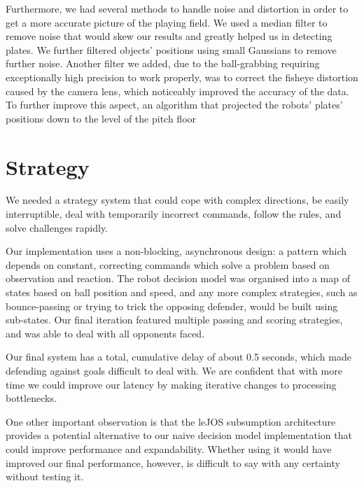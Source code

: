 \documentclass[a4paper,11pt]{article}
\begin{document}
Furthermore, we had several methods to handle noise and distortion in order to get a more accurate picture of the playing field. We used a median filter to remove noise that would skew our results and greatly helped us in detecting plates. We further filtered objects’ positions using small Gaussians to remove further noise. Another filter we added, due to the ball-grabbing requiring exceptionally high precision to work properly, was to correct the fisheye distortion caused by the camera lens, which noticeably improved the accuracy of the data. To further improve this aspect, an algorithm that projected the robots’ plates’ positions down to the level of the pitch floor 


\section{Strategy}

We needed a strategy system that could cope with complex directions, be easily interruptible, deal with temporarily incorrect commands, follow the rules, and solve challenges rapidly.

Our implementation uses a non-blocking, asynchronous design: a pattern which depends on constant, correcting commands which solve a problem based on observation and reaction. The robot decision model was organised into a map of states based on ball position and speed, and any more complex strategies, such as bounce-passing or trying to trick the opposing defender, would be built using sub-states. Our final iteration featured multiple passing and scoring strategies, and was able to deal with all opponents faced.

Our final system has a total, cumulative delay of about 0.5 seconds, which made defending against goals difficult to deal with. We are confident that with more time we could improve our latency by making iterative changes to processing bottlenecks.

One other important observation is that the leJOS subsumption architecture provides a potential alternative to our naive decision model implementation that could improve performance and expandability. Whether using it would have improved our final performance, however, is difficult to say with any certainty without testing it.
\end{document}
